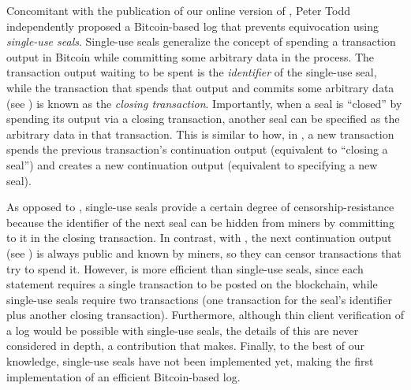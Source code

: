 Concomitant with the publication of our online version of \Sys\cite{catena-eprint}, Peter Todd independently proposed a Bitcoin-based log that prevents equivocation using \emph{single-use seals}\cite{single-use-seals}.
Single-use seals generalize the concept of spending a transaction output in Bitcoin while committing some arbitrary data in the process.
The transaction output waiting to be spent is the \emph{identifier} of the single-use seal, while the transaction that spends that output and commits some arbitrary data (see ) is known as the \emph{closing transaction}.
Importantly, when a seal is ``closed'' by spending its output via a closing transaction, another seal can be specified as the arbitrary data in that transaction.
This is similar to how, in \Sys, a new transaction spends the previous transaction's continuation output (equivalent to ``closing a seal'') and creates a new continuation output (equivalent to specifying a new seal).

As opposed to \Sys, single-use seals provide a certain degree of censorship-resistance because the identifier of the next seal can be hidden from miners by committing to it in the closing transaction.
In contrast, with \Sys, the next continuation output (see ) is always public and known by miners, so they can censor transactions that try to spend it.
However, \Sys is more efficient than single-use seals, since each statement requires a single transaction to be posted on the blockchain, while single-use seals require two transactions (one transaction for the seal's identifier plus another closing transaction).
Furthermore, although thin client verification of a log would be possible with single-use seals, the details of this are never considered in depth\cite{single-use-seals}, a contribution that \Sys makes.
Finally, to the best of our knowledge, single-use seals have not been implemented yet, making \Sys the first implementation of an efficient Bitcoin-based log.

